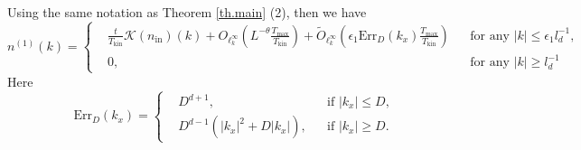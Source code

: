 \begin{prop}\label{prop.mainterms} Using the same notation as Theorem \ref{th.main} (2), then we have 
\begin{equation}
        n^{(1)}(k)=\left\{
\begin{aligned}
    &\frac{t}{T_{\mathrm{kin}}}\mathcal K(n_{\mathrm{in}})(k)+O_{\ell^\infty_k}\left(L^{-\theta}\frac{T_{\text{max}}}{T_{\mathrm {kin}}}\right)+\widetilde{O}_{\ell^\infty_k}\left(\epsilon_1\text{Err}_{D}(k_x)\frac{T_{\text{max}}}{T_{\mathrm {kin}}}\right)
    && \text{for any } |k|\le \epsilon_1 l_{d}^{-1},
    \\
    &0, && \text{for any } |k|\ge l_{d}^{-1}
\end{aligned}\right.
    \end{equation}
    Here 
    \begin{equation}
        \text{Err}_{D}(k_x)=\left\{\begin{aligned}
    &D^{d+1}, && \text{if } |k_x|\le D,
    \\
    &D^{d-1}(|k_x|^2+D|k_x|), && \text{if } |k_x|\ge D.
\end{aligned}
    \right.
    \end{equation}
\end{prop}
